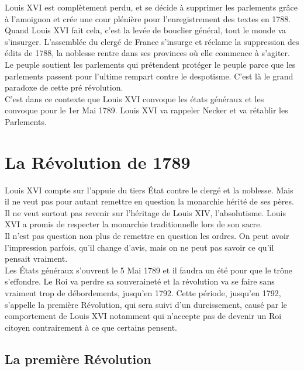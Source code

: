 \documentclass[10pt, a4paper, openany]{book}
\begin{document}
Louis XVI est complètement perdu, et se décide à supprimer les parlements grâce à l'amoignon et crée une cour plénière pour l'enregistrement des textes en 1788. Quand Louis XVI fait cela, c'est la levée de bouclier général, tout le monde va s'insurger. L'assemblée du clergé de France s'insurge et réclame la suppression des édits de 1788, la noblesse rentre dans ses provinces où elle commence à s'agiter. \\
Le peuple soutient les parlements qui prétendent protéger le peuple parce que les parlements passent pour l'ultime rempart contre le despotisme. C'est là le grand paradoxe de cette pré révolution. \\
C'est dans ce contexte que Louis XVI convoque les états généraux et les convoque pour le 1er Mai 1789. Louis XVI va rappeler Necker et va rétablir les Parlements. 


\part{La Révolution de 1789}

Louis XVI compte sur l'appuie du tiers État contre le clergé et la noblesse. Mais il ne veut pas pour autant remettre en question la monarchie hérité de ses pères. Il ne veut surtout pas revenir sur l'héritage de Louis XIV, l'absolutisme. Louis XVI a promis de respecter la monarchie traditionnelle lors de son sacre. \\
Il n'est pas question non plus de remettre en question les ordres. On peut avoir l'impression parfois, qu'il change d'avis, mais on ne peut pas savoir ce qu'il pensait vraiment. \\
Les États généraux s'ouvrent le 5 Mai 1789 et il faudra un été pour que le trône s'effondre. Le Roi va perdre sa souveraineté et la révolution va se faire sans vraiment trop de débordements, jusqu'en 1792. Cette période, jusqu'en 1792, s'appelle la première Révolution, qui sera suivi d'un durcissement, causé par le comportement de Louis XVI notamment qui n'accepte pas de devenir un Roi citoyen contrairement à ce que certains pensent.

\chapter{La première Révolution}
\end{document}
